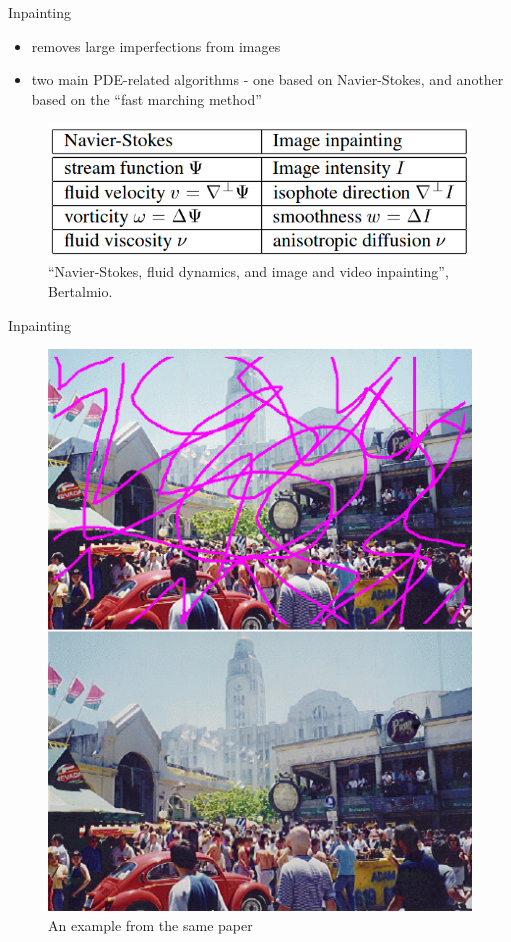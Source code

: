 \documentclass{beamer}
\begin{document}
\begin{frame}{Inpainting}
    
    \begin{itemize}
        \item removes large imperfections from images
        \item two main PDE-related algorithms - one based on Navier-Stokes, and another based on the ``fast marching method''
    \end{itemize}
    
    \begin{figure}[h!]
        \centering            \includegraphics[scale=0.35]{inpainting4.png} \caption{``Navier-Stokes, fluid dynamics, and image and video inpainting'', Bertalmio.}
    \end{figure}

\end{frame}

\begin{frame}{Inpainting}
    
    \begin{figure}[h!]
        \centering            \includegraphics[scale=0.35]{inpainting1.png}
        \caption{An example from the same paper}
    \end{figure}

\end{frame}
\end{document}
